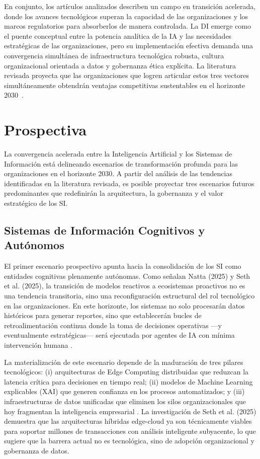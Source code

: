 \documentclass[conference]{IEEEtran}
\begin{document}
En conjunto, los artículos analizados describen un campo en transición acelerada, donde los avances tecnológicos superan la capacidad de las organizaciones y los marcos regulatorios para absorberlos de manera controlada. La DI emerge como el puente conceptual entre la potencia analítica de la IA y las necesidades estratégicas de las organizaciones, pero su implementación efectiva demanda una convergencia simultánea de infraestructura tecnológica robusta, cultura organizacional orientada a datos y gobernanza ética explícita. La literatura revisada proyecta que las organizaciones que logren articular estos tres vectores simultáneamente obtendrán ventajas competitivas sustentables en el horizonte 2030~\cite{natta2025, seth2025, heilig2024, tasleem2024, jeyanthi2022}.

\section{Prospectiva}
La convergencia acelerada entre la Inteligencia Artificial y los Sistemas de Información está delineando escenarios de transformación profunda para las organizaciones en el horizonte 2030. A partir del análisis de las tendencias identificadas en la literatura revisada, es posible proyectar tres escenarios futuros predominantes que redefinirán la arquitectura, la gobernanza y el valor estratégico de los SI.

\subsection{Sistemas de Información Cognitivos y Autónomos}
El primer escenario prospectivo apunta hacia la consolidación de los SI como entidades cognitivas plenamente autónomas. Como señalan Natta (2025) y Seth et al. (2025), la transición de modelos reactivos a ecosistemas proactivos no es una tendencia transitoria, sino una reconfiguración estructural del rol tecnológico en las organizaciones. En este horizonte, los sistemas no solo procesarán datos históricos para generar reportes, sino que establecerán bucles de retroalimentación continua donde la toma de decisiones operativas —y eventualmente estratégicas— será ejecutada por agentes de IA con mínima intervención humana \cite{natta2025, seth2025}.

La materialización de este escenario depende de la maduración de tres pilares tecnológicos: (i) arquitecturas de Edge Computing distribuidas que reduzcan la latencia crítica para decisiones en tiempo real; (ii) modelos de Machine Learning explicables (XAI) que generen confianza en los procesos automatizados; y (iii) infraestructuras de datos unificadas que eliminen los silos organizacionales que hoy fragmentan la inteligencia empresarial \cite{seth2025, tasleem2024}. La investigación de Seth et al. (2025) demuestra que las arquitecturas híbridas edge-cloud ya son técnicamente viables para soportar millones de transacciones con análisis inteligente subyacente, lo que sugiere que la barrera actual no es tecnológica, sino de adopción organizacional y gobernanza de datos.
\end{document}
